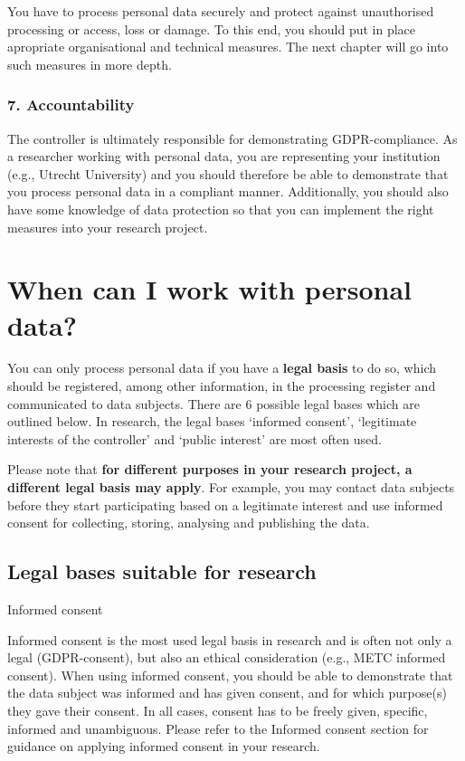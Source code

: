 \documentclass[
]{book}
\begin{document}
You have to process personal data securely and protect against unauthorised processing or access,
loss or damage. To this end, you should put in place apropriate organisational and technical measures.
The next chapter will go into such measures in more depth.

\hypertarget{accountability}{%
\subsubsection{7. Accountability}\label{accountability}}

The controller is ultimately responsible for demonstrating GDPR-compliance. As a researcher working with personal data,
you are representing your institution (e.g., Utrecht University) and you should therefore be able to demonstrate
that you process personal data in a compliant manner. Additionally, you should also have some knowledge of
data protection so that you can implement the right measures into your research project.

\hypertarget{legal-basis}{%
\section*{When can I work with personal data?}\label{legal-basis}}

You can only process personal data if you have a \textbf{legal basis} to do so, which should be registered,
among other information, in the processing register
and communicated to data subjects. There are 6 possible legal bases
which are outlined below. In research, the legal bases `informed consent', `legitimate interests
of the controller' and `public interest' are most often used.

Please note that \textbf{for different purposes in your research project, a different legal basis may apply}.
For example, you may contact data subjects before they start participating based on a legitimate interest
and use informed consent for collecting, storing, analysing and publishing the data.

\hypertarget{legal-bases-suitable-for-research}{%
\subsection{Legal bases suitable for research}\label{legal-bases-suitable-for-research}}

Informed consent

Informed consent
is the most used legal basis in research and is often not only a legal (GDPR-consent), but also an ethical consideration
(e.g., METC informed consent). When using informed consent, you should be able to demonstrate that the data subject was informed and has
given consent, and for which purpose(s) they gave their consent. In all cases, consent has to be freely given, specific, informed and unambiguous.
Please refer to the Informed consent section for guidance on applying informed consent in your research.
\end{document}
